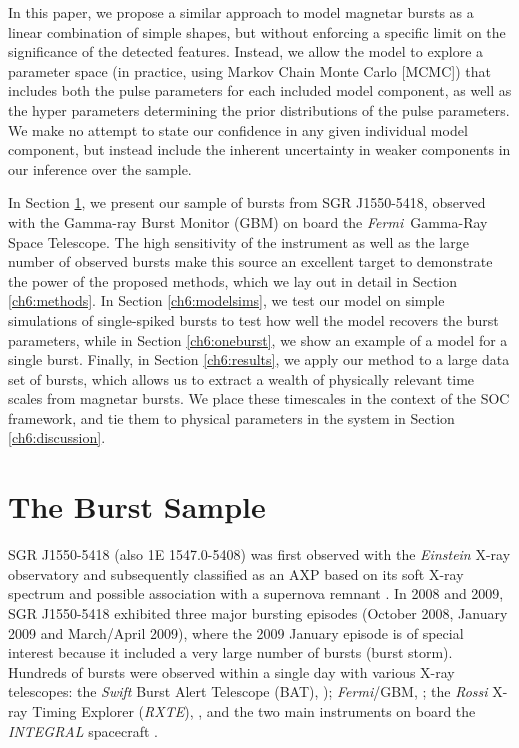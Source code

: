 \documentclass[12pt]{emulateapj}
\newcommand{\project}[1]{\textsl{#1}}
\newcommand{\fermi}{\project{Fermi}}
\newcommand{\rxte}{\project{RXTE}}
\begin{document}
{ In this paper, we propose a similar approach to model magnetar bursts as a linear combination of simple shapes, but without enforcing a specific limit on the significance of 
 the detected features. Instead, we allow the model to explore a parameter space  (in practice, using Markov Chain Monte Carlo [MCMC]) that includes both the 
 pulse parameters for each included model component, as well as 
 the hyper parameters determining the prior distributions of the pulse parameters. We make no attempt to state our confidence in any given individual model component, 
 but instead include the inherent uncertainty in weaker components in our inference over the sample.
  }

In Section \ref{ch6:data}, we present our sample of bursts from SGR J1550-5418, observed with the 
Gamma-ray Burst Monitor (GBM) on board the \fermi\ Gamma-Ray Space Telescope.
The high sensitivity of the instrument as well as 
the large number of observed bursts make this source an excellent target to demonstrate the power of the proposed methods, which we
lay out in detail in Section \ref{ch6:methods}.
In Section \ref{ch6:modelsims}, we test our model on simple simulations of single-spiked bursts to test how well the model recovers the burst parameters, while
in Section \ref{ch6:oneburst}, we show an example of a model for a single burst. Finally, in Section \ref{ch6:results}, we apply our method to a large data set of bursts, 
which allows us to extract a wealth of physically relevant time scales from magnetar bursts. 
We place these timescales in the context of the SOC framework, and tie them to physical parameters in the system in Section \ref{ch6:discussion}.


\section{The Burst Sample}
\label{ch6:data}

SGR J1550-5418 (also 1E 1547.0-5408) was first observed with the {\it Einstein} X-ray observatory \citep{lamb1981}
and subsequently classified as an AXP based on its soft X-ray spectrum and possible association with a supernova remnant \citep{gelfand2007}.
In 2008 and 2009, SGR J1550-5418 exhibited three major bursting episodes (October 2008, January 2009 and March/April 2009), where the 2009 January episode is of special interest 
because it included a very large number of bursts (burst storm). Hundreds of bursts were observed within a single day with various X-ray telescopes: 
the \project{Swift} Burst Alert Telescope (BAT), \citep{israel2010, scholz2011}); \fermi/GBM, \citep{kaneko2010,vonkienlin2012,vanderhorst2012}; the \project{Rossi} 
X-ray Timing Explorer (\rxte), \citep{dib2012}, and the two main instruments on board the \project{INTEGRAL} spacecraft \citep{mereghetti2009, savchenko2010}.
 
\end{document}
